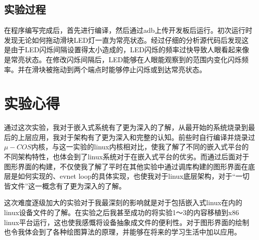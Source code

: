 \documentclass{report}
\begin{document}
\section{实验过程}
\label{sec:shi_yan_guo_cheng_}
\par 在程序编写完成后，首先进行编译，然后通过adb上传开发板后运行。初次运行时发现无论如何拖动滑块LED灯一直为常亮状态。经过仔细的分析源代码后发现这是由于LED闪烁间隔设置得太小造成的，LED闪烁的频率过快导致人眼看起来像是常亮状态。在修改闪烁间隔后，LED能够在人眼能观察到的范围内变化闪烁频率。并在滑块被拖动到两个端点时能够停止闪烁或到达常亮状态。

\chapter*{实验心得}
\par 通过这次实验，我对于嵌入式系统有了更为深入的了解，从最开始的系统烧录到最后的上层应用，我对于架构有了更为深入和完整的认知。前些时自行编译并烧录过$\mu-COS$内核，与这一实验的linux内核相对比，使我了解了不同的嵌入式平台的不同架构特性，也体会到了linux系统对于在嵌入式平台的优劣。而通过后面对于图形界面的构建，不仅使我了解了平时在其他实验中通过调库构建的图形界面在底层是如何实现的、evnet loop的具体实现，也使我对于linux底层架构，对于“一切皆文件”这一概念有了更为深入的了解。
\par 这次难度逐级加大的实验对于我最深刻的影响就是对于包括嵌入式linux在内的linux设备文件的了解。在实验之后我甚至成功的将实验1～3的内容移植到x86 linux平台运行，这也使我感慨将设备抽象成文件的便利性。对于图形界面的绘制也令我体会到了各种绘图算法的原理，并能够在将来的学习生活中加以应用。

\end{document}
